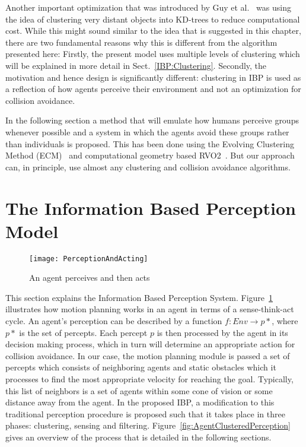 Another important optimization that was introduced by Guy et al.~\cite{Guy:2010uv} was using the idea of clustering very distant objects into KD-trees to reduce computational cost. While this might sound similar to the idea that is suggested in this chapter, there are two fundamental reasons why this is different from the algorithm presented here: Firstly, the present model uses multiple levels of clustering which will be explained in more detail in Sect.~\ref{IBP:Clustering}. Secondly, the motivation and hence design is significantly different: clustering in IBP is used as a reflection of how agents perceive their environment and not an optimization for collision avoidance.

In the following section a method that will emulate how humans perceive groups whenever possible and a system in which the agents avoid these groups rather than individuals is proposed. This has been done using the Evolving Clustering Method (ECM)~\cite{Song:2001vg} and computational geometry based RVO2~\cite{Wilkie:2009da}. But our approach can, in principle, use almost any clustering and collision avoidance algorithms.


\section{The Information Based Perception Model}
\label{IBP:Theory}

\begin{figure}[!t]
\centering
\texttt{[image: PerceptionAndActing]}
\caption[Perception and Acting]{An agent perceives and then acts}
\label{fig:AgentPerceptionAct}
\end{figure}

This section explains the Information Based Perception System. Figure~\ref{fig:AgentPerceptionAct} illustrates how motion planning works in an agent in terms of a sense-think-act cycle. An agent's perception can be described by a function $ f: Env \rightarrow p*$, where $p*$ is the set of percepts. Each percept $p$ is then processed by the agent in its decision making process, which in turn will determine an appropriate action for collision avoidance. In our case, the motion planning module is passed a set of percepts which consists of neighboring agents and static obstacles which it processes to find the most appropriate velocity for reaching the goal. Typically, this list of neighbors is a set of agents within some cone of vision or some distance away from the agent. In the proposed IBP, a modification to this traditional perception procedure is proposed such that it takes place in three phases: clustering, sensing and filtering. Figure~\ref{fig:AgentClusteredPerception} gives an overview of the process that is detailed in the following sections.


